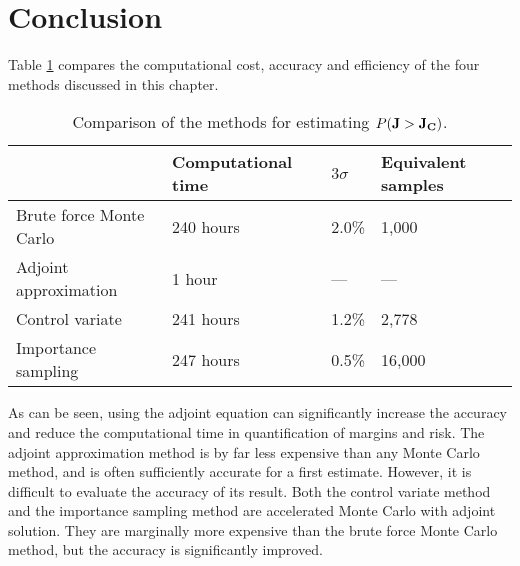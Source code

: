 \section{Conclusion}
Table \ref{tab_comp} compares
the computational cost, accuracy and efficiency of the four methods discussed
in this chapter.
\begin{table}[htb!] \center
\caption{Comparison of the methods for estimating $P({\bf J} > {\bf J_C})$.}
\begin{tabular}{llll}
\\
\hline
& Computational time & $3\sigma$ & Equivalent samples \\
\hline
Brute force Monte Carlo & 240 hours & 2.0\% & 1,000  \\
Adjoint approximation   & 1 hour    & ---   & ---    \\
Control variate         & 241 hours & 1.2\% & 2,778  \\
Importance sampling     & 247 hours & 0.5\% & 16,000 \\
\hline
\end{tabular}
\label{tab_comp}
\end{table}
As can be seen, using the adjoint equation can significantly
increase the accuracy and reduce the computational time in quantification of
margins and risk.  The adjoint approximation method is by far less expensive
than any Monte Carlo method, and is often sufficiently accurate for a first
estimate.  However, it is difficult to evaluate the accuracy of its result.
Both the control variate method and the importance sampling method are
accelerated Monte Carlo with adjoint solution.
They are marginally more expensive than the brute force Monte Carlo method,
but the accuracy is significantly improved.


%
